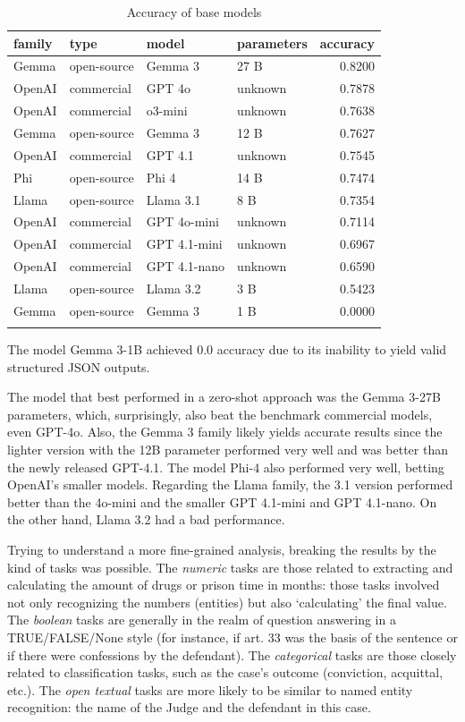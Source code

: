 \documentclass[
  12pt,
]{article}
\begin{document}
\begin{longtable}[t]{llllr}

\toprule
family & type & model & parameters & accuracy\\
\midrule
Gemma & open-source & Gemma 3 & 27 B & 0.8200\\
OpenAI & commercial & GPT 4o & unknown & 0.7878\\
OpenAI & commercial & o3-mini & unknown & 0.7638\\
Gemma & open-source & Gemma 3 & 12 B & 0.7627\\
OpenAI & commercial & GPT 4.1 & unknown & 0.7545\\
\addlinespace
Phi & open-source & Phi 4 & 14 B & 0.7474\\
Llama & open-source & Llama 3.1 & 8 B & 0.7354\\
OpenAI & commercial & GPT 4o-mini & unknown & 0.7114\\
OpenAI & commercial & GPT 4.1-mini & unknown & 0.6967\\
OpenAI & commercial & GPT 4.1-nano & unknown & 0.6590\\
\addlinespace
Llama & open-source & Llama 3.2 & 3 B & 0.5423\\
Gemma & open-source & Gemma 3 & 1 B & 0.0000\\
\bottomrule


\caption{\label{tbl-accuracy-metadata}Accuracy of base models}

\tabularnewline
\end{longtable}

The model Gemma 3-1B achieved 0.0 accuracy due to its inability to yield
valid structured JSON outputs.

The model that best performed in a zero-shot approach was the Gemma
3-27B parameters, which, surprisingly, also beat the benchmark
commercial models, even GPT-4o. Also, the Gemma 3 family likely yields
accurate results since the lighter version with the 12B parameter
performed very well and was better than the newly released GPT-4.1. The
model Phi-4 also performed very well, betting OpenAI's smaller models.
Regarding the Llama family, the 3.1 version performed better than the
4o-mini and the smaller GPT 4.1-mini and GPT 4.1-nano. On the other
hand, Llama 3.2 had a bad performance.

Trying to understand a more fine-grained analysis, breaking the results
by the kind of tasks was possible. The \emph{numeric} tasks are those
related to extracting and calculating the amount of drugs or prison time
in months: those tasks involved not only recognizing the numbers
(entities) but also `calculating' the final value. The \emph{boolean}
tasks are generally in the realm of question answering in a
TRUE/FALSE/None style (for instance, if art. 33 was the basis of the
sentence or if there were confessions by the defendant). The
\emph{categorical} tasks are those closely related to classification
tasks, such as the case's outcome (conviction, acquittal, etc.). The
\emph{open textual} tasks are more likely to be similar to named entity
recognition: the name of the Judge and the defendant in this case.
\end{document}
